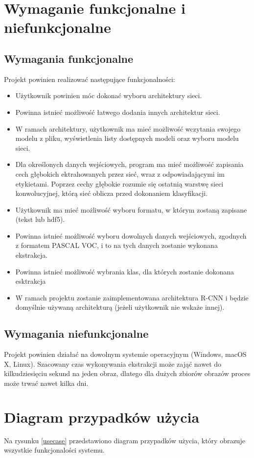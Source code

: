 \documentclass[a4paper,twoside,12pt]{book}
\begin{document}
{\section{Wymaganie funkcjonalne i niefunkcjonalne}
\subsection{Wymagania funkcjonalne}
{Projekt powinien realizować następujące funkcjonalności:
\begin{itemize}
\item{Użytkownik powinien móc dokonać wyboru architektury sieci.}
 \item {Powinna istnieć możliwość łatwego dodania innych architektur sieci.}
 \item{W ramach architektury, użytkownik ma mieć możliwość wczytania swojego modelu z pliku, wyświetlenia listy dostępnych modeli oraz wyboru modelu sieci.}
  \item {Dla określonych danych wejściowych, program ma mieć możliwość zapisania cech głębokich ektrahowanych przez sieć, wraz z odpowiadającymi im etykietami. Poprzez cechy głębokie rozumie się ostatnią warstwę sieci konwolucyjnej, którą sieć oblicza przed dokonaniem klasyfikacji. }
  \item{Użytkownik ma mieć możliwość wyboru formatu, w którym zostaną zapisane (tekst lub hdf5).}
  \item{Powinna istnieć możliwość wyboru dowolnych danych wejściowych, zgodnych z formatem PASCAL VOC, i to na tych danych zostanie wykonana ekstrakcja.}
  \item{Powinna istnieć możliwość wybrania klas, dla których zostanie dokonana esktrakcja}
  \item{W ramach projektu zostanie zaimplementowana architektura R-CNN i będzie domyślnie używaną architekturą (jeżeli użytkownik nie wskaże innej).}
\end{itemize}}
\subsection{Wymagania niefunkcjonalne}
{Projekt powinien działać na dowolnym systemie operacyjnym (Windows, macOS X, Linux). Szacowany czas wykonywania ekstrakcji może zająć nawet do kilkudziesięciu sekund na jeden obraz, dlatego dla dużych zbiorów obrazów proces może trwać nawet kilka dni. }
\section{Diagram przypadków użycia}
{Na rysunku \ref{usecase} przedstawiono diagram przypadków użycia, który obrazuje wszystkie funkcjonalości systemu.}
{
\begin{figure}[h!]


\end{figure}}}
\end{document}
